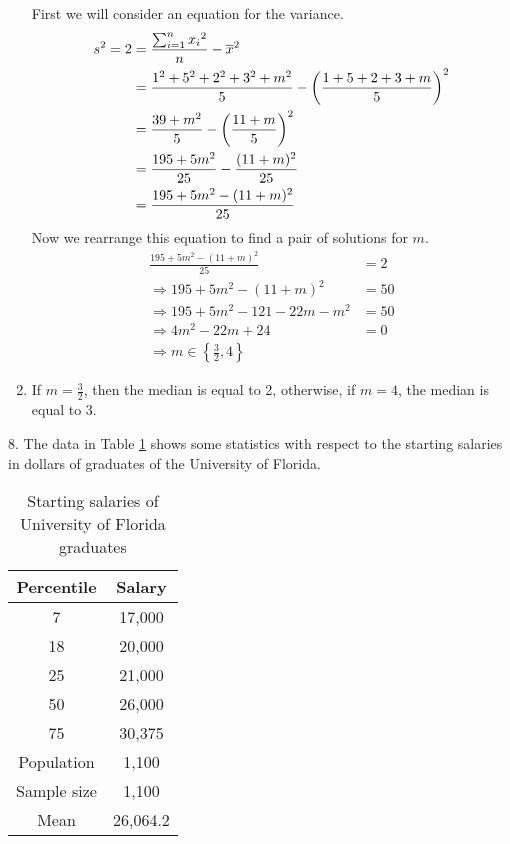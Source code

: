 \documentclass[fleqn]{article}
\begin{document}
\begin{answers}
\begin{enumerate}
		First we will consider an equation for the variance.
		\begin{align*}
			s^2 = 2 & = \frac{\sum_{i=1}^n {x_i}^2}{n} - \overline{x}^2                                             \\
			        & = \frac{1^2 + 5^2 + 2^2 + 3^2 + m^2}{5} - \left( \frac{1 + 5 + 2 + 3 + m}{5} \right)^2 \\
			        & = \frac{39 + m^2}{5} - \left( \frac{11 + m}{5} \right)^2                               \\
			        & = \frac{195 + 5m^2}{25} - \frac{(11 + m)^2}{25}                                        \\
			        & = \frac{195 + 5m^2 - (11 + m)^2}{25}                                                   \\
		\end{align*}
		Now we rearrange this equation to find a pair of solutions for \(m\).
		\begin{align*}
			\frac{195 + 5m^2 - (11 + m)^2}{25}       & = 2  \\
			\Rightarrow 195 + 5m^2 - (11 + m)^2      & = 50 \\
			\Rightarrow 195 + 5m^2 - 121 - 22m - m^2 & = 50 \\
			\Rightarrow 4m^2 - 22m + 24              & = 0  \\
			\Rightarrow m \in \left\{ \frac{3}{2}, 4 \right\}
		\end{align*}

		\item %
		If \(m = \frac{3}{2}\), then the median is equal to 2, otherwise, if \(m = 4\), the median is equal to 3.
	\end{enumerate}

	\item[8.]
	The data in Table \ref{q8-table} shows some statistics with respect to the starting salaries in	dollars of graduates of the University of Florida.

	\begin{table}[tb]
		\centering
		\begin{tabular}{||c|c||}
			\hline
			Percentile  & Salary   \\
			\hline
			7           & 17,000   \\
			18          & 20,000   \\
			25          & 21,000   \\
			50          & 26,000   \\
			75          & 30,375   \\
			\hline
			\hline
			Population  & 1,100    \\
			Sample size & 1,100    \\
			\hline
			Mean        & 26,064.2 \\
			\hline
		\end{tabular}
		\caption{Starting salaries of University of Florida graduates}
		\label{q8-table}
	\end{table}


\end{answers}
\end{document}
